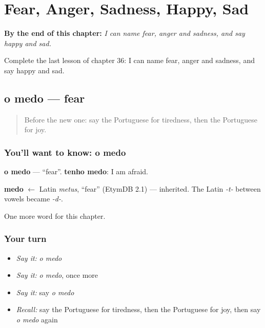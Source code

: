 
\chapter{Fear, Anger, Sadness, Happy, Sad}
\label{ch:pt-fear-anger-sadness-happy-sad}

\begin{chapteropening}
\textbf{By the end of this chapter:} \emph{I can name fear, anger and sadness, and say happy and sad.}

Complete the last lesson of chapter 36: I can name fear, anger and sadness, and say happy and sad.
\end{chapteropening}

\section[o medo]{o medo — fear}

\label{lesson:PT-C36-medo}



\begin{quote}
Before the new one: say the Portuguese for tiredness, then the Portuguese for joy.
\end{quote}

\subsection*{You'll want to know: o medo}
\textbf{o medo} — \textquotedblleft{}fear\textquotedblright{}. \textbf{tenho medo}: I am afraid.

\begin{cousinweb}
\textbf{medo} $\leftarrow$ Latin \emph{metus}, \textquotedblleft{}fear\textquotedblright{} (EtymDB 2.1) — inherited. The Latin \emph{-t-} between vowels became \emph{-d-}.
\end{cousinweb}

\begin{grammarlens}[title={What you've built}]
One more word for this chapter.
\end{grammarlens}

\subsection*{Your turn}
\begin{itemize}
\raggedright
  \item \emph{Say it:} \emph{o medo}
  \item \emph{Say it:} \emph{o medo}, once more
  \item \emph{Say it:} say \emph{o medo}
  \item \emph{Recall:} say the Portuguese for tiredness, then the Portuguese for joy, then say \emph{o medo} again
\end{itemize}


